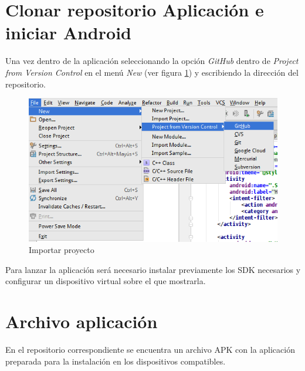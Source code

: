 \section{Clonar repositorio Aplicación e iniciar Android}

Una vez dentro de la aplicación seleccionando la opción \textit{GitHub} dentro de \textit{Project from Version Control} en el menú \textit{New} (ver figura \ref{fig:android-studio}) y escribiendo la dirección del repositorio.

\begin{figure}[H]
\centering
\includegraphics[scale=0.5, fbox={\fboxrule} 4mm]{images/07-anexo/01-android_studio.png}
\caption{Importar proyecto}
\label{fig:android-studio}
\end{figure}

Para lanzar la aplicación será necesario instalar previamente los SDK necesarios y configurar un dispositivo virtual sobre el que mostrarla.

\section{Archivo aplicación}
En el repositorio correspondiente se encuentra un archivo APK con la aplicación preparada para la instalación en los dispositivos compatibles.


